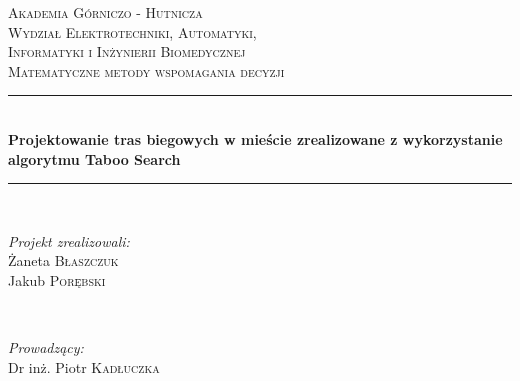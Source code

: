 \begin{titlepage}

\newcommand{\HRule}{\rule{\linewidth}{0.5mm}} %

\center %
 

\textsc{\LARGE Akademia Górniczo - Hutnicza}\\[1.5cm] %
\textsc{\Large Wydział Elektrotechniki, Automatyki,\protect\\[-1mm] Informatyki i Inżynierii Biomedycznej}\\[0.5cm] %
\textsc{\large Matematyczne metody wspomagania decyzji}\\[0.5cm] %


\HRule \\[0.4cm]
{ \huge \bfseries Projektowanie tras biegowych w mieście zrealizowane z wykorzystanie algorytmu Taboo Search}\\[0.4cm] %
\HRule \\[1.5cm]
 

\begin{minipage}{0.4\textwidth}
\begin{flushleft} \large
\emph{Projekt zrealizowali:}\\
Żaneta \textsc{Błaszczuk} \\ %
Jakub \textsc{Porębski}
\end{flushleft}
\end{minipage}
~
\begin{minipage}{0.5\textwidth} %
\begin{flushright} \large
\emph{Prowadzący:} \\
Dr inż. Piotr \textsc{Kadłuczka} %
\end{flushright}
\end{minipage}\\[1cm]


\end{titlepage}
